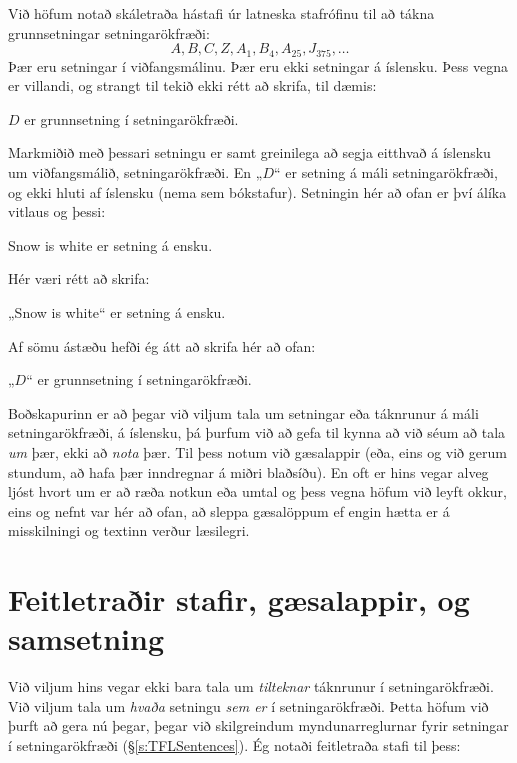 Við höfum notað skáletraða hástafi úr latneska stafrófinu til að tákna grunnsetningar setningarökfræði: 
$$A, B, C, Z, A_1, B_4, A_{25}, J_{375},\ldots$$
Þær eru setningar í viðfangsmálinu. Þær eru ekki setningar á íslensku. Þess vegna er villandi, og strangt til tekið ekki rétt að skrifa, til dæmis:
	\begin{ebullet}
		\item $D$ er grunnsetning í setningarökfræði.
	\end{ebullet}
Markmiðið með þessari setningu er samt greinilega að segja eitthvað á íslensku um viðfangsmálið, setningarökfræði. En „$D$“ er setning á máli setningarökfræði, og ekki hluti af íslensku (nema sem bókstafur). Setningin hér að ofan er því álíka vitlaus og þessi:	
	\begin{ebullet}
		\item Snow is white er setning á ensku.
	\end{ebullet}
Hér væri rétt að skrifa: 	
	\begin{ebullet}
		\item „Snow is white“ er setning á ensku.
	\end{ebullet}
Af sömu ástæðu hefði ég átt að skrifa hér að ofan:	
	\begin{ebullet}
		\item „$D$“ er grunnsetning í setningarökfræði.
	\end{ebullet}
Boðskapurinn er að þegar við viljum tala um setningar eða táknrunur á máli setningarökfræði, á íslensku, þá þurfum við að gefa til kynna að við séum að tala \emph{um} þær, ekki að \emph{nota} þær. Til þess notum við gæsalappir (eða, eins og við gerum stundum, að hafa þær inndregnar á miðri blaðsíðu). En oft er hins vegar alveg ljóst hvort um er að ræða notkun eða umtal og þess vegna höfum við leyft okkur, eins og nefnt var hér að ofan, að sleppa gæsalöppum ef engin hætta er á misskilningi og textinn verður læsilegri.
	
\section{Feitletraðir stafir, gæsalappir, og samsetning}

Við viljum hins vegar ekki bara tala um \emph{tilteknar} táknrunur í setningarökfræði. Við viljum tala um \emph{hvaða} setningu \emph{sem er} í setningarökfræði. Þetta höfum við þurft að gera nú þegar, þegar við skilgreindum myndunarreglurnar fyrir setningar í setningarökfræði (\S\ref{s:TFLSentences}). Ég notaði feitletraða stafi til þess:

